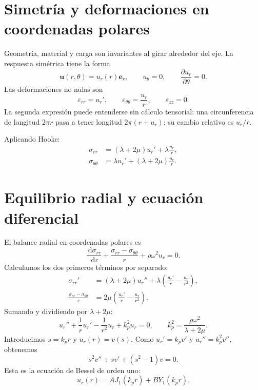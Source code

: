 \documentclass[11pt,a4paper]{report}
\numberwithin{equation}{chapter}
\newcommand{\vect}[1]{\bm{#1}}
\newcommand{\dd}{\,\mathrm{d}}
\begin{document}
\section{Simetr\'ia y deformaciones en coordenadas polares}
Geometr\'ia, material y carga son invariantes al girar alrededor del eje.
La respuesta sim\'etrica tiene la forma
\begin{equation}
 \vect u(r,\theta)=u_r(r)\vect e_r,\qquad
 u_\theta=0,\qquad \frac{\partial u_r}{\partial\theta}=0.
\end{equation}
Las deformaciones no nulas son
\begin{equation}
 \varepsilon_{rr}=u_r',\qquad
 \varepsilon_{\theta\theta}=\frac{u_r}{r},\qquad
 \varepsilon_{zz}=0.
 \label{eq:strain-polar}
\end{equation}
La segunda expresi\'on puede entenderse sin c\'alculo tensorial:
una circunferencia de longitud $2\pi r$ pasa a tener longitud
$2\pi(r+u_r)$; su cambio relativo es $u_r/r$.

Aplicando Hooke:
\begin{align}
 \sigma_{rr}&=(\lambda+2\mu)u_r'+\lambda\frac{u_r}{r},\\
 \sigma_{\theta\theta}&=\lambda u_r'
                         +(\lambda+2\mu)\frac{u_r}{r}.
 \label{eq:stress-polar}
\end{align}

\section{Equilibrio radial y ecuaci\'on diferencial}
El balance radial en coordenadas polares es
\begin{equation}
 \frac{\dd\sigma_{rr}}{\dd r}
 +\frac{\sigma_{rr}-\sigma_{\theta\theta}}{r}
 +\rho\omega^2u_r=0.
\end{equation}
Calculamos los dos primeros t\'erminos por separado:
\begin{align}
 \sigma_{rr}'&=(\lambda+2\mu)u_r''
                +\lambda\left(\frac{u_r'}r-\frac{u_r}{r^2}\right),\\
 \frac{\sigma_{rr}-\sigma_{\theta\theta}}r
              &=2\mu\left(\frac{u_r'}r-\frac{u_r}{r^2}\right).
\end{align}
Sumando y dividiendo por $\lambda+2\mu$:
\begin{equation}
 u_r''+\frac1r u_r'-\frac1{r^2}u_r+k_p^2u_r=0,\qquad
 k_p^2=\frac{\rho\omega^2}{\lambda+2\mu}.
 \label{eq:ode-radial}
\end{equation}
Introducimos $s=k_pr$ y $u_r(r)=v(s)$. Como
$u_r'=k_pv'$ y $u_r''=k_p^2v''$, obtenemos
\begin{equation}
  s^2v''+sv'+(s^2-1)v=0.
\end{equation}
Esta es la ecuaci\'on de Bessel de orden uno:
\begin{equation}
  u_r(r)=A J_1(k_pr)+B Y_1(k_pr).
\end{equation}
\end{document}

